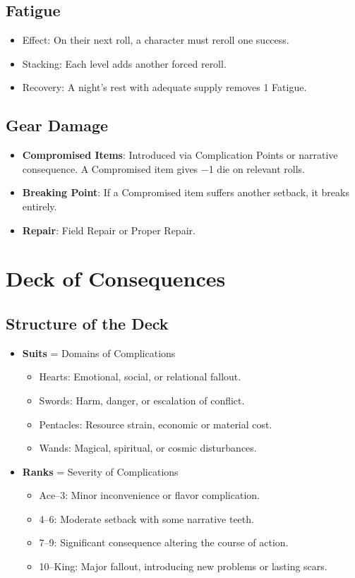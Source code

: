 \documentclass[11pt]{article}
\begin{document}
\subsection{Fatigue}
\begin{itemize}
    \item Effect: On their next roll, a character must reroll one success.
    \item Stacking: Each level adds another forced reroll.
    \item Recovery: A night's rest with adequate supply removes 1 Fatigue.
\end{itemize}

\subsection{Gear Damage}
\begin{itemize}
    \item \textbf{Compromised Items}: Introduced via Complication Points or narrative consequence. A Compromised item gives −1 die on relevant rolls.
    \item \textbf{Breaking Point}: If a Compromised item suffers another setback, it breaks entirely.
    \item \textbf{Repair}: Field Repair or Proper Repair.
\end{itemize}

\section{Deck of Consequences}

\subsection{Structure of the Deck}
\begin{itemize}
    \item \textbf{Suits} = Domains of Complications
    \begin{itemize}
        \item Hearts: Emotional, social, or relational fallout.
        \item Swords: Harm, danger, or escalation of conflict.
        \item Pentacles: Resource strain, economic or material cost.
        \item Wands: Magical, spiritual, or cosmic disturbances.
    \end{itemize}
    \item \textbf{Ranks} = Severity of Complications
    \begin{itemize}
        \item Ace–3: Minor inconvenience or flavor complication.
        \item 4–6: Moderate setback with some narrative teeth.
        \item 7–9: Significant consequence altering the course of action.
        \item 10–King: Major fallout, introducing new problems or lasting scars.
    \end{itemize}
\end{itemize}
\end{document}
